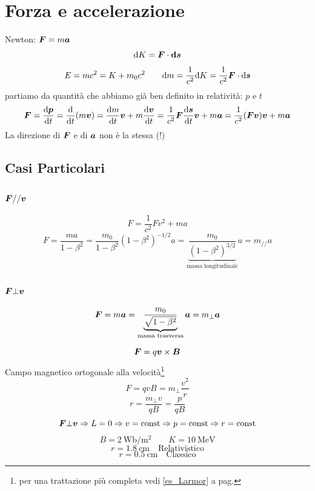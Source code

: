 \section{Forza e accelerazione}
Newton: $\boldsymbol{F}=m\boldsymbol{a}$
\[\mathrm{d} K=\boldsymbol{F}\cdot\boldsymbol{ \mathrm{d} s}\]
\[E=mc^2=K+m_0c^2\qquad \mathrm{d} m=\frac{1}{c^2}\mathrm{d} K=\frac{1}{c^2}\boldsymbol{F}\cdot \mathrm{d} \boldsymbol{s}\]
partiamo da quantità che abbiamo già ben definito in relatività: $p$ e $t$
\[\boldsymbol{F}=\frac{\mathrm{d} \boldsymbol{p}}{\mathrm{d} t}=\frac{\mathrm{d}}{\mathrm{d} t}(m\boldsymbol{v})=\frac{\mathrm{d} m}{\mathrm{d} t}\boldsymbol{v}+m\frac{\mathrm{d} \boldsymbol{v}}{\mathrm{d} t}=\frac{1}{c^2}\boldsymbol{F}\frac{\mathrm{d} \boldsymbol{s}}{\mathrm{d} t}\boldsymbol{v}+m\boldsymbol{a}=\frac{1}{c^2}(\boldsymbol{F}\boldsymbol{v})\boldsymbol{v}+m\boldsymbol{a}\]
La direzione di $\boldsymbol{F}$ e di $\boldsymbol{a}$ non è la stessa (!)
\subsection{Casi Particolari}
\subsubsection{$\boldsymbol{F} // \boldsymbol{v}$}
\[F=\frac{1}{c^2}Fv^2+ma\]
\[F=\frac{ma}{1-\beta^2}=\frac{m_0}{1-\beta^2}(1-\beta^2)^{-1/2}a=\underbrace{\frac{m_0}{(1-\beta^2)^{3/2}}}_{\text{massa longitudinale}}a=m_{//}a\]
\subsubsection{$\boldsymbol{F}\bot\boldsymbol{v}$}
\[\boldsymbol{F}=m\boldsymbol{a}=\underbrace{\frac{m_0}{\sqrt{1-\beta^2}}}_\text{massa trasversa}\boldsymbol{a}=m_\perp \boldsymbol{a}\]
\begin{Es}
   \[\boldsymbol{F}=q\boldsymbol{v}\times\boldsymbol{B}\]
   Campo magnetico ortogonale alla velocità\footnote{per una trattazione più completa vedi \ref{es_Larmor} a pag.\@\pageref{es_Larmor}}
   \[F=qvB=m_\bot\frac{v^2}{r}\]
   \[r=\frac{m_\bot v}{qB}=\frac{p}{qB}\]
   \[\boldsymbol{F}\bot \boldsymbol{v}\Rightarrow L=0\Rightarrow v=\text{const}\Rightarrow p=\text{const}\Rightarrow r=\text{const}\]
   \[B=\SI{2}{\weber\per\meter\squared} \qquad K=\SI{10}{\mega\electronvolt} \]
   \[r=\SI{1.8}{\centi\meter} \quad\text{Relativistico}\]
   \[r=\SI{0.5}{\centi\meter} \quad\text{Classico}\]
\end{Es}


\pagebreak
